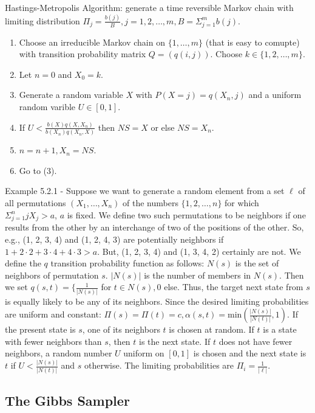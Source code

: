 \documentclass{article}
\begin{document}
Hastings-Metropolis Algorithm: generate a time reversible Markov chain with limiting distribution $\Pi_j = \frac{b(j)}{B}, j = 1, 2, \dots, m, B = \Sigma_{j=1}^m b(j)$. \begin{enumerate} \item Choose an irreducible Markov chain on $\{1, \dots, m\}$ (that is easy to comupte) with transition probability matrix $Q = (q(i, j))$. Choose $k \in \{1, 2, \dots, m\}$. \item Let $n = 0$ and $X_0 = k$. \item Generate a random variable $X$ with $P(X=j) = q(X_n, j)$ and a uniform random varible $U \in [0, 1]$. \item If $U < \frac{b(X) q(X, X_n)}{b(X_n) q (X_n, X)}$ then $NS = X$ or else $NS = X_n$. \item $n = n+1, X_n = NS$. \item Go to (3). \end{enumerate}

Example 5.2.1 - Suppose we want to generate a random element from a set $\ell$ of all permutations $(X_1, \dots, X_n)$ of the numbers $\{1, 2, \dots, n\}$ for which $\Sigma_{j=1}^n j X_j > a$, $a$ is fixed. We define two such permutations to be neighbors if one results from the other by an interchange of two of the positions of the other. So, e.g., (1, 2, 3, 4) and (1, 2, 4, 3) are potentially neighbors if $1+2 \cdot 2 + 3 \cdot 4 + 4 \cdot 3 > a$. But, (1, 2, 3, 4) and (1, 3, 4, 2) certainly are not. We define the $q$ transition probability function as follows: $N(s)$ is the set of neighbors of permutation $s$. $|N(s)|$ is the number of members in $N(s)$. Then we set $q(s, t) = \{ \frac{1}{|N(s)|}$ for $t \in N(s), 0$ else. Thus, the target next state from $s$ is equally likely to be any of its neighbors. Since the desired limiting probabilities are uniform and constant: $\Pi(s) = \Pi(t) = c, \alpha(s, t) = \mathrm{min}(\frac{|N(s)|}{|N(t)|}, 1)$. If the present state is $s$, one of its neighbors $t$ is chosen at random. If $t$ is a state with fewer neighbors than $s$, then $t$ is the next state. If $t$ does not have fewer neighbors, a random number $U$ uniform on $[0, 1]$ is chosen and the next state is $t$ if $U < \frac{|N(s)|}{|N(t)|}$ and $s$ otherwise. The limiting probabilities are $\Pi_i = \frac{1}{|\ell|}$.

\subsection{The Gibbs Sampler}
\end{document}
